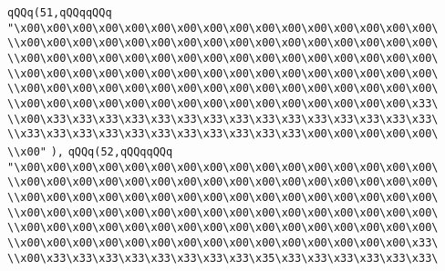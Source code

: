 \verb|qQQq(51,qQQqqQQq|\newline
\verb|"\x00\x00\x00\x00\x00\x00\x00\x00\x00\x00\x00\x00\x00\x00\x00\x00\|\newline
\verb|\\x00\x00\x00\x00\x00\x00\x00\x00\x00\x00\x00\x00\x00\x00\x00\x00\|\newline
\verb|\\x00\x00\x00\x00\x00\x00\x00\x00\x00\x00\x00\x00\x00\x00\x00\x00\|\newline
\verb|\\x00\x00\x00\x00\x00\x00\x00\x00\x00\x00\x00\x00\x00\x00\x00\x00\|\newline
\verb|\\x00\x00\x00\x00\x00\x00\x00\x00\x00\x00\x00\x00\x00\x00\x00\x00\|\newline
\verb|\\x00\x00\x00\x00\x00\x00\x00\x00\x00\x00\x00\x00\x00\x00\x00\x33\|\newline
\verb|\\x00\x33\x33\x33\x33\x33\x33\x33\x33\x33\x33\x33\x33\x33\x33\x33\|\newline
\verb|\\x33\x33\x33\x33\x33\x33\x33\x33\x33\x33\x33\x00\x00\x00\x00\x00\|\newline
\verb|\\x00"|\newline
\verb|),|\newline
\verb|qQQq(52,qQQqqQQq|\newline
\verb|"\x00\x00\x00\x00\x00\x00\x00\x00\x00\x00\x00\x00\x00\x00\x00\x00\|\newline
\verb|\\x00\x00\x00\x00\x00\x00\x00\x00\x00\x00\x00\x00\x00\x00\x00\x00\|\newline
\verb|\\x00\x00\x00\x00\x00\x00\x00\x00\x00\x00\x00\x00\x00\x00\x00\x00\|\newline
\verb|\\x00\x00\x00\x00\x00\x00\x00\x00\x00\x00\x00\x00\x00\x00\x00\x00\|\newline
\verb|\\x00\x00\x00\x00\x00\x00\x00\x00\x00\x00\x00\x00\x00\x00\x00\x00\|\newline
\verb|\\x00\x00\x00\x00\x00\x00\x00\x00\x00\x00\x00\x00\x00\x00\x00\x33\|\newline
\verb|\\x00\x33\x33\x33\x33\x33\x33\x33\x33\x35\x33\x33\x33\x33\x33\x33\|\newline
